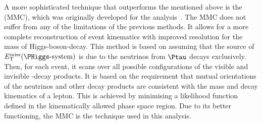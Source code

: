 A more sophisticated technique that outperforms the mentioned above is the \MMC (MMC), which was originally developed for the \Htautau analysis~\cite{ELAGIN2011481,ATLAS:2012gfw}. 
The MMC does not suffer from any of the limitations of the previous methods. It allows for a more complete reconstruction
of event kinematics with improved resolution for the mass of Higgs-boson-decay. 
This method is based on assuming that the source of $\MET(\PHiggs\text{-system})$ is 
due to the neutrinos from $\Ptau$ decays exclusively. Then, for each event, it scans over all possible
configurations of the visible and invisible \Ptau-decay products. 
It is based on the requirement that mutual orientations of the neutrinos and other decay products are consistent with the mass and decay kinematics of a \Ptau lepton. This is achieved by minimising a likelihood function defined in the kinematically allowed phase space region. 
Due to its better functioning, the MMC is the technique used in this analysis.


